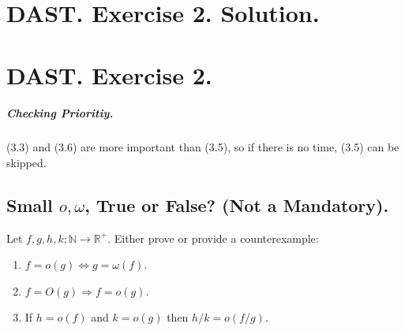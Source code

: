 \fi







 



\setcounter{chapter}{2}
\ifdefined\SOLUTION
  \chapter{DAST. Exercise 2. Solution.}
\else
  \chapter{DAST. Exercise 2.}
\fi

\ifdefined\CHECK

\paragraph{Checking Prioritiy.} (3.3) and (3.6) are more important than (3.5), so if there is no time, (3.5) can be skipped.


\paragraph{}

\fi



 \section{Small $o,\omega$, True or False? (Not a Mandatory). }
 Let $f,g,h,k : \mathbb{N} \rightarrow \mathbb{R}^{+}$. Either prove or provide a counterexample:
\begin{enumerate}
  \item $f = o(g) \Leftrightarrow g = \omega(f)$. 
  \item $f = O(g) \Rightarrow f = o(g)$. 
  \item If $h = o(f)$ and $k = o(g)$ then $h/k = o(f/g)$.  
\end{enumerate}

\ifdefined\SOLUTION
\fi

